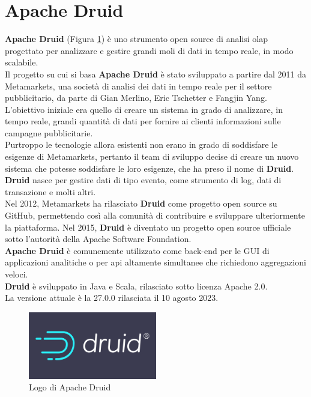 \section{Apache Druid}
\textbf{Apache Druid} (Figura \ref{fig:logo_druid}) è uno strumento \gls{open source}{} di analisi \gls{olap}{} progettato per analizzare e gestire grandi moli di dati in tempo reale, in modo scalabile. \\
Il progetto su cui si basa \textbf{Apache Druid} è stato sviluppato a partire dal 2011 da Metamarkets, una società di analisi dei dati in tempo reale per il settore pubblicitario,
da parte di Gian Merlino, Eric Tschetter e Fangjin Yang.\\
L'obiettivo iniziale era quello di creare un sistema in grado di analizzare, in tempo reale, grandi quantità di dati per fornire ai clienti 
informazioni sulle campagne pubblicitarie.\\
Purtroppo le tecnologie allora esistenti non erano in grado di soddisfare le esigenze di Metamarkets, pertanto il team di sviluppo decise di creare un nuovo sistema che potesse soddisfare le loro esigenze, che ha preso il nome di \textbf{Druid}.\\
\textbf{Druid} nasce per gestire dati di tipo evento, come strumento di \gls{log}{}, dati di transazione e molti altri. \\
Nel 2012, Metamarkets ha rilasciato \textbf{Druid}{} come progetto \gls{open source}{} su GitHub, permettendo così alla comunità di contribuire e sviluppare ulteriormente la piattaforma. Nel 2015, \textbf{Druid} è diventato un progetto \gls{open source}{} ufficiale sotto l'autorità della \gls{Apache Software Foundation}{}.\\ 
\textbf{Apache Druid} è comunemente utilizzato come back-end per le GUI di applicazioni analitiche o
per \gls{api}{} altamente simultanee che richiedono aggregazioni veloci. \\
\textbf{Druid} è sviluppato in Java e Scala, rilasciato sotto licenza Apache 2.0. \\La versione attuale è la 27.0.0 rilasciata il 10 agosto 2023.\\
\begin{figure}[h]
    \centering
    \includegraphics[width=0.5\textwidth]{images/componenti/logo_druid.png}
    \caption{Logo di Apache Druid}
    \label{fig:logo_druid}
\end{figure}

